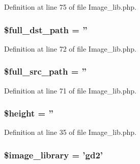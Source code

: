 Definition at line 75 of file Image\-\_\-lib.\-php.

\hypertarget{class_c_i___image__lib_aa830804dc9d15c51e0672bd4d3602e07}{
\subsubsection[{\$full\-\_\-dst\-\_\-path}]{\setlength{\rightskip}{0pt plus 5cm}\$full\-\_\-dst\-\_\-path = ''}}\label{class_c_i___image__lib_aa830804dc9d15c51e0672bd4d3602e07}


Definition at line 72 of file Image\-\_\-lib.\-php.

\hypertarget{class_c_i___image__lib_a7ccf54c8f559eaf70600f69554be39eb}{
\subsubsection[{\$full\-\_\-src\-\_\-path}]{\setlength{\rightskip}{0pt plus 5cm}\$full\-\_\-src\-\_\-path = ''}}\label{class_c_i___image__lib_a7ccf54c8f559eaf70600f69554be39eb}


Definition at line 71 of file Image\-\_\-lib.\-php.

\hypertarget{class_c_i___image__lib_a2c265bba1724371bb03e6901297c30b2}{
\subsubsection[{\$height}]{\setlength{\rightskip}{0pt plus 5cm}\$height = ''}}\label{class_c_i___image__lib_a2c265bba1724371bb03e6901297c30b2}


Definition at line 35 of file Image\-\_\-lib.\-php.

\hypertarget{class_c_i___image__lib_ac4b224358e1169eec8db344bcb3186c0}{
\subsubsection[{\$image\-\_\-library}]{\setlength{\rightskip}{0pt plus 5cm}\$image\-\_\-library = 'gd2'}}\label{class_c_i___image__lib_ac4b224358e1169eec8db344bcb3186c0}


